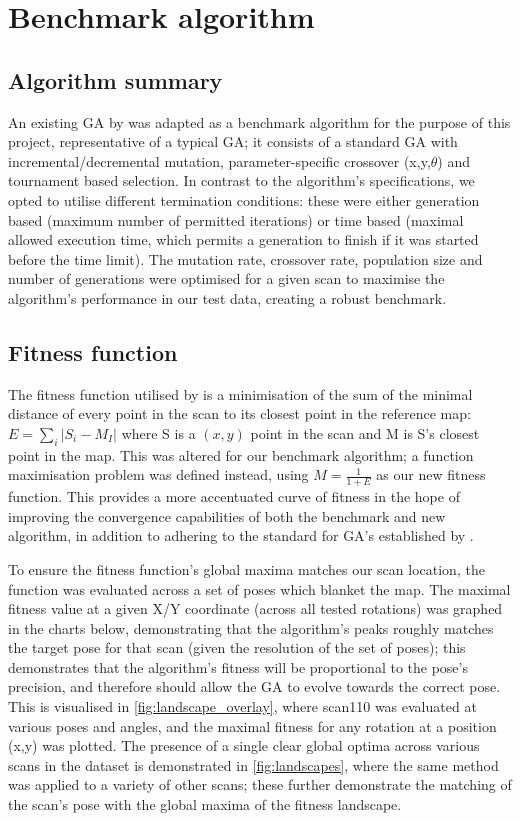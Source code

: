 \documentclass[authoryearcitations]{UoYCSproject}
\begin{document}
\chapter{Benchmark algorithm}
\section{Algorithm summary}
An existing GA by \citet{Robertson2002-ou} was adapted as a benchmark algorithm for the purpose of this project, representative of a typical GA; it consists of a standard GA with incremental/decremental mutation, parameter-specific crossover (x,y,$\theta$) and tournament based selection. In contrast to the algorithm's specifications, we opted to utilise different termination conditions: these were either generation based (maximum number of permitted iterations) or time based (maximal allowed execution time, which permits a generation to finish if it was started before the time limit). The mutation rate, crossover rate, population size and number of generations were optimised for a given scan to maximise the algorithm's performance in our test data, creating a robust benchmark.

\section{Fitness function}
\label{sec:fitness_landscape}
The fitness function utilised by \citet{Robertson2002-ou} is a minimisation of the sum of the minimal distance of every point in the scan to its closest point in the reference map: $E = \sum_i |S_i-M_I|$ where S is a $(x,y)$ point in the scan and M is S's closest point in the map. This was altered for our benchmark algorithm; a function maximisation problem was defined instead, using $M = \frac{1}{1+E}$ as our new fitness function. This provides a more accentuated curve of fitness in the hope of improving the convergence capabilities of both the benchmark and new algorithm, in addition to adhering to the standard for GA's established by \citet{Eiben2015-de}.

To ensure the fitness function's global maxima matches our scan location, the function was evaluated across a set of poses which blanket the map. The maximal fitness value at a given X/Y coordinate (across all tested rotations) was graphed in the charts below, demonstrating that the algorithm's peaks roughly matches the target pose for that scan (given the resolution of the set of poses); this demonstrates that the algorithm's fitness will be proportional to the pose's precision, and therefore should allow the GA to evolve towards the correct pose. This is visualised in \autoref{fig:landscape_overlay}, where scan110 was evaluated at various poses and angles, and the maximal fitness for any rotation at a position (x,y) was plotted. The presence of a single clear global optima across various scans in the dataset is demonstrated in \autoref{fig:landscapes}, where the same method was applied to a variety of other scans; these further demonstrate the matching of the scan's pose with the global maxima of the fitness landscape. 
\end{document}
